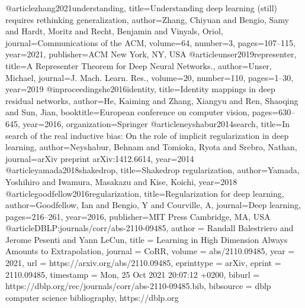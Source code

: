 \documentclass[nohyperref]{article}
\theoremstyle{plain}
\theoremstyle{definition}
\theoremstyle{remark}
\begin{document}
@article{zhang2021understanding,
  title={Understanding deep learning (still) requires rethinking generalization},
  author={Zhang, Chiyuan and Bengio, Samy and Hardt, Moritz and Recht, Benjamin and Vinyals, Oriol},
  journal={Communications of the ACM},
  volume={64},
  number={3},
  pages={107--115},
  year={2021},
  publisher={ACM New York, NY, USA}
}
@article{unser2019representer,
  title={A Representer Theorem for Deep Neural Networks.},
  author={Unser, Michael},
  journal={J. Mach. Learn. Res.},
  volume={20},
  number={110},
  pages={1--30},
  year={2019}
}
@inproceedings{he2016identity,
  title={Identity mappings in deep residual networks},
  author={He, Kaiming and Zhang, Xiangyu and Ren, Shaoqing and Sun, Jian},
  booktitle={European conference on computer vision},
  pages={630--645},
  year={2016},
  organization={Springer}
}
@article{neyshabur2014search,
  title={In search of the real inductive bias: On the role of implicit regularization in deep learning},
  author={Neyshabur, Behnam and Tomioka, Ryota and Srebro, Nathan},
  journal={arXiv preprint arXiv:1412.6614},
  year={2014}
}
@article{yamada2018shakedrop,
  title={Shakedrop regularization},
  author={Yamada, Yoshihiro and Iwamura, Masakazu and Kise, Koichi},
  year={2018}
}
@article{goodfellow2016regularization,
  title={Regularization for deep learning},
  author={Goodfellow, Ian and Bengio, Y and Courville, A},
  journal={Deep learning},
  pages={216--261},
  year={2016},
  publisher={MIT Press Cambridge, MA, USA}
}
@article{DBLP:journals/corr/abs-2110-09485,
  author    = {Randall Balestriero and
               Jerome Pesenti and
               Yann LeCun},
  title     = {Learning in High Dimension Always Amounts to Extrapolation},
  journal   = {CoRR},
  volume    = {abs/2110.09485},
  year      = {2021},
  url       = {https://arxiv.org/abs/2110.09485},
  eprinttype = {arXiv},
  eprint    = {2110.09485},
  timestamp = {Mon, 25 Oct 2021 20:07:12 +0200},
  biburl    = {https://dblp.org/rec/journals/corr/abs-2110-09485.bib},
  bibsource = {dblp computer science bibliography, https://dblp.org}
}
\end{document}
